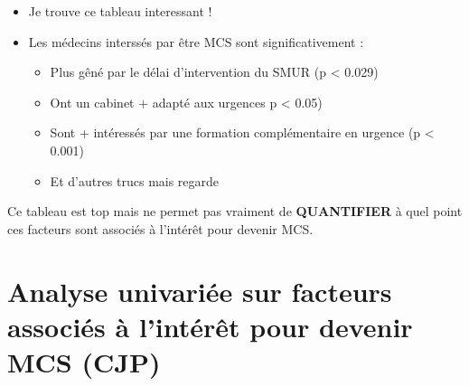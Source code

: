 \documentclass[
]{article}
\begin{document}
\begin{itemize}
\item
  Je trouve ce tableau interessant !
\item
  Les médecins interssés par être MCS sont significativement :

  \begin{itemize}
  \item
    Plus gêné par le délai d'intervention du SMUR (p \textless{} 0.029)
  \item
    Ont un cabinet + adapté aux urgences p \textless{} 0.05)
  \item
    Sont + intéressés par une formation complémentaire en urgence (p
    \textless{} 0.001)
  \item
    Et d'autres trucs mais regarde
  \end{itemize}
\end{itemize}

Ce tableau est top mais ne permet pas vraiment de \textbf{QUANTIFIER} à
quel point ces facteurs sont associés à l'intérêt pour devenir MCS.

\section{Analyse univariée sur facteurs associés à l'intérêt pour
devenir MCS
(CJP)}\label{analyse-univariuxe9e-sur-facteurs-associuxe9s-uxe0-lintuxe9ruxeat-pour-devenir-mcs-cjp}
\end{document}

